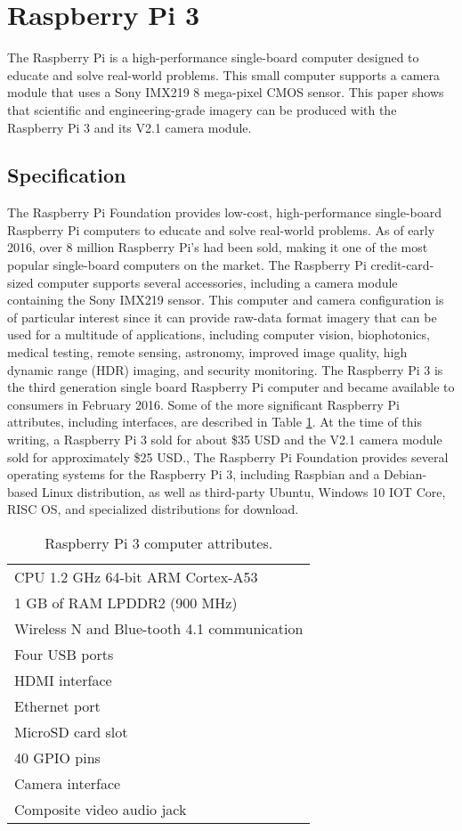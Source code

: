 \section{Raspberry Pi 3}
\label{sec:raspi3}
The Raspberry Pi is a high-performance single-board computer designed to educate
and solve real-world problems. This small computer supports a camera module that
uses a Sony IMX219 8 mega-pixel CMOS sensor.  This paper shows that scientific
and engineering-grade imagery can be produced with the Raspberry Pi 3  and its
V2.1 camera module.
%
\subsection{Specification}
\label{ssec:raspispecification}
The Raspberry Pi Foundation provides low-cost, high-performance single-board 
Raspberry Pi computers to educate and solve real-world problems.  As of early
2016, over 8 million Raspberry Pi's had been sold, making it one of the most
popular single-board computers on the market.\cite{upton2016raspberry} The
Raspberry Pi credit-card-sized computer supports several accessories, including
a camera module containing the Sony IMX219 sensor. This computer and camera
configuration is of particular interest since it can provide raw-data format
imagery that can be used for a multitude of applications, including computer
vision, biophotonics, medical testing, remote sensing, astronomy, improved image
quality, high dynamic range (HDR) imaging, and security monitoring. The
Raspberry Pi 3 is the third generation single board Raspberry Pi computer and
became available to consumers in February 2016. Some of the more significant
Raspberry Pi attributes, including interfaces, are described in Table
\ref{tab:rapberryattributes}. At the time of this writing, a Raspberry Pi 3 sold
for about \$35 USD and the V2.1 camera module sold for approximately \$25
USD.\cite{upton2016raspberry, raspberrycam}, The Raspberry Pi Foundation
provides several operating systems for the Raspberry Pi 3,  including Raspbian
and a Debian-based Linux distribution, as well as third-party Ubuntu, Windows 10
IOT Core, RISC OS, and specialized distributions for
download.\cite{10.1117/1.JEI.26.1.013014}
%
\begin{table}[htb]
\centering
	\caption{Raspberry Pi 3 computer attributes.}
	\label{tab:rapberryattributes}
	\begin{tabular}{l}
		\hline
		CPU 1.2 \si{\giga\hertz} 64-bit ARM Cortex-A53 \\
		1 GB of RAM LPDDR2 (900 \si{\mega\hertz}) \\
		Wireless N and Blue-tooth 4.1 communication\\
		Four USB ports\\
		HDMI interface\\
		Ethernet port\\
		MicroSD card slot\\
		40 GPIO pins\\
		Camera interface\\
		Composite video audio jack\\
		\hline
\end{tabular}
\end{table}
%
